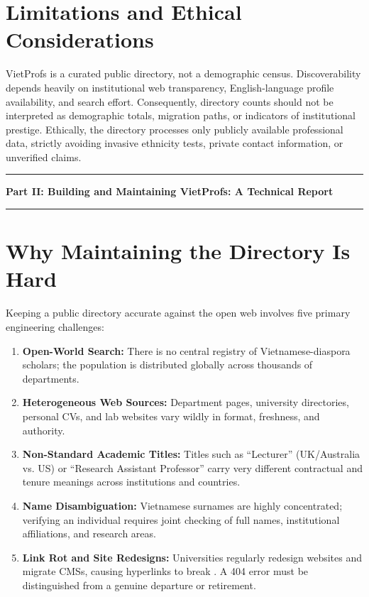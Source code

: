 \documentclass[11pt]{article}
\begin{document}
\section{Limitations and Ethical Considerations}
\label{sec:limitations}
VietProfs is a curated public directory, not a demographic census. Discoverability depends heavily on institutional web transparency, English-language profile availability, and search effort. Consequently, directory counts should not be interpreted as demographic totals, migration paths, or indicators of institutional prestige.
Ethically, the directory processes only publicly available professional data, strictly avoiding invasive ethnicity tests, private contact information, or unverified claims.

\vspace{0.6em}
\noindent\rule{\linewidth}{0.4pt}
\begin{center}
{\Large\textbf{Part II: Building and Maintaining VietProfs: A Technical Report}}
\end{center}
\noindent\rule{\linewidth}{0.4pt}
\vspace{0.4em}

\section{Why Maintaining the Directory Is Hard}
\label{sec:hard}
Keeping a public directory accurate against the open web involves five primary engineering challenges:
\begin{enumerate}
\item \textbf{Open-World Search:} There is no central registry of Vietnamese-diaspora scholars; the population is distributed globally across thousands of departments.
\item \textbf{Heterogeneous Web Sources:} Department pages, university directories, personal CVs, and lab websites vary wildly in format, freshness, and authority.
\item \textbf{Non-Standard Academic Titles:} Titles such as ``Lecturer'' (UK/Australia vs. US) or ``Research Assistant Professor'' carry very different contractual and tenure meanings across institutions and countries.
\item \textbf{Name Disambiguation:} Vietnamese surnames are highly concentrated; verifying an individual requires joint checking of full names, institutional affiliations, and research areas.
\item \textbf{Link Rot and Site Redesigns:} Universities regularly redesign websites and migrate CMSs, causing hyperlinks to break \cite{bar-yossef2004sic}. A 404 error must be distinguished from a genuine departure or retirement.
\end{enumerate}
\end{document}
